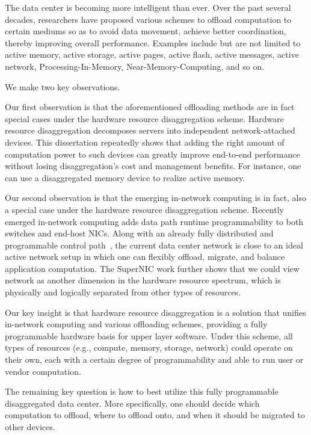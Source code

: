 The data center is becoming more intelligent than ever.
Over the past several decades, researchers have proposed various
schemes to offload computation to certain mediums so as to
avoid data movement, achieve better coordination, thereby improving overall performance.
Examples include but are not limited to active memory, active storage, active pages,
active flash, active messages, active network, Processing-In-Memory, Near-Memory-Computing, and so on.

We make two key observations.

Our first observation is that the aforementioned offloading methods are
in fact special cases under the hardware resource disaggregation scheme.
%
Hardware resource disaggregation decomposes servers into independent network-attached devices.
This dissertation repeatedly shows that adding the right amount of
computation power to such devices can greatly improve end-to-end performance
without losing disaggregation's cost and management benefits.
For instance, one can use a disaggregated memory device to realize active memory.

Our second observation is that the emerging in-network computing
is in fact, also a special case under the hardware resource disaggregation scheme.
%
Recently emerged in-network computing adds data path runtime programmability
to both switches and end-host NICs.
Along with an already fully distributed and programmable control path~\cite{orion-nsdi},
the current data center network is close to
an ideal active network setup in which one can flexibly offload, migrate, and balance application computation.
The SuperNIC work further shows that we could view network as
another dimension in the hardware resource spectrum,
which is physically and logically separated from other types of resources.

Our key insight is that hardware resource disaggregation is a solution
that unifies in-network computing and various offloading schemes,
providing a fully programmable hardware basis for upper layer software.
%
Under this scheme, all types of resources (e.g., compute, memory, storage, network)
could operate on their own, each with a certain degree of programmability and able to run user or vendor computation.

The remaining key question is how to best utilize this fully programmable disaggregated data center. More specifically, one should decide which computation to offload, where to offload onto, and when it should be migrated to other devices.

